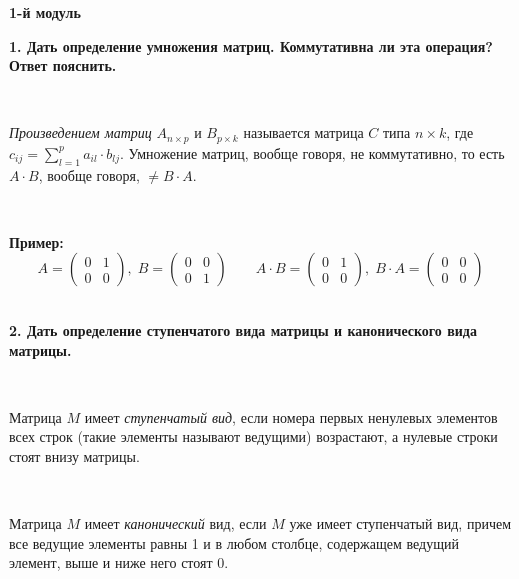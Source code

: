 \documentclass{article}
\begin{document}
    \pagestyle{fancy}
    \fancyhead{}
    \fancyhead[C]{\normalsize\color{gray}{Коллоквиум определения, 2022 г.}}
    \fancyhead[R]{\normalsize\color{gray}{github.com/Sofiika/AlgebraKollok}}
    \fancyhead[L]{\normalsize\color{gray}{ПИ, линейная алгебра}}
    \fancyfoot[C]{\normalsize\color{gray}{\thepage}}
    \renewcommand{\footrulewidth}{0.1 mm}
    \Large
    \centering

    \textbf{1-й модуль}

    \flushleft
    \small

    \textbf{1. Дать определение умножения матриц. Коммутативна ли эта операция? Ответ пояснить.}


    {
        $\;$
        \setlength{\parindent}{0.4cm}
        \hangindent=0.4cm

    \textit{Произведением матриц} $A_{n\times p}$ и $B_{p\times k}$ называется матрица $C$ типа $n\times k$, где
        $c_{ij}=\sum\limits_{l=1}^p a_{il}\cdot b_{lj}$. Умножение матриц, вообще говоря, не коммутативно, то есть $A\cdot B$, вообще говоря, $\ne B\cdot A$.

        $\;$

        \textbf{Пример:}
        $$
        A=\begin{pmatrix}
              0 & 1 \\
              0 & 0
    \end{pmatrix}, \; B=\begin{pmatrix}
                            0 & 0 \\
                            0 & 1
    \end{pmatrix}
        \qquad
        A\cdot B=\begin{pmatrix}
                     0 & 1 \\
                     0 & 0
    \end{pmatrix}, \; B\cdot A=\begin{pmatrix}
                                   0 & 0 \\
                                   0 & 0
    \end{pmatrix}$$
        $\;$
        \setlength{\parindent}{0cm}
        \hangindent=0cm
    }

    \textbf{2. Дать определение ступенчатого вида матрицы и канонического вида матрицы.}

    {
        $\;$
        \setlength{\parindent}{0.4cm}
        \hangindent=0.4cm

    Матрица $M$ имеет \textit{ступенчатый вид}, если номера первых ненулевых элементов всех строк (такие элементы называют ведущими) возрастают, а нулевые строки стоят внизу матрицы.

        $\;$

        Матрица $M$ имеет \textit{канонический} вид, если $M$ уже имеет ступенчатый вид, причем все ведущие элементы равны 1 и в любом столбце, содержащем ведущий элемент, выше и ниже него стоят 0.

        $\;$
        \setlength{\parindent}{0cm}
        \hangindent=0cm
    }
\end{document}
